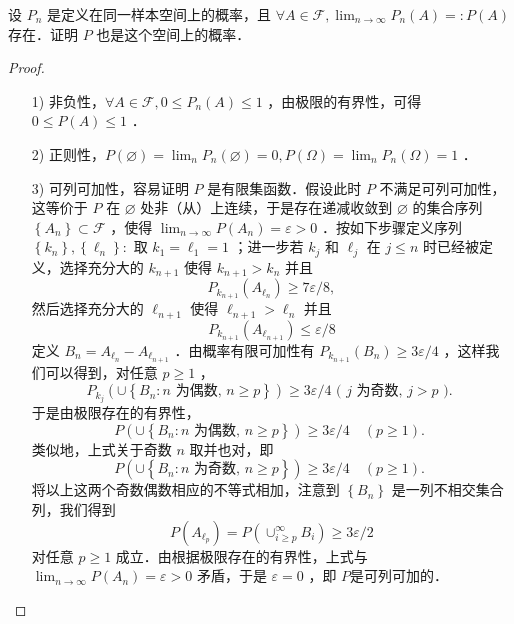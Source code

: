 \begin{exercise}
    设 $P_n$ 是定义在同一样本空间上的概率，且 $\forall A \in \mathscr{F}, \lim _{n \rightarrow \infty} P_n(A)=: P(A)$ 存在．证明 $P$ 也是这个空间上的概率．
\end{exercise}
\begin{proof}
    \begin{enumerate}
        \item[1)] 非负性，$\forall A \in \mathscr{F}, 0 \leq P_n(A) \leq 1$ ，由极限的有界性，可得 $0 \leq P(A) \leq 1$ ．
        \item[2)] 正则性，$P(\varnothing)=\lim _n P_n(\varnothing)=0, P(\Omega)=\lim _n P_n(\Omega)=1$ ．
        \item[3)] 可列可加性，容易证明 $P$ 是有限集函数．假设此时 $P$ 不满足可列可加性，这等价于 $P$ 在 $\varnothing$ 处非（从）上连续，于是存在递减收敛到 $\varnothing$ 的集合序列 $\left\{A_n\right\} \subset \mathscr{F}$ ，使得 $\lim _{n \rightarrow \infty} P\left(A_n\right)=\varepsilon>0$ ．按如下步骤定义序列 $\left\{k_n\right\},\left\{\ell_n\right\}:$ 取 $k_1=\ell_1=1$ ；进一步若 $k_j$ 和 $\ell_j$ 在 $j \leq n$ 时已经被定义，选择充分大的 $k_{n+1}$ 使得 $k_{n+1}>k_n$ 并且
            $$
                P_{k_{n+1}}\left(A_{\ell_n}\right) \geq 7 \varepsilon / 8,
            $$
            然后选择充分大的 $\ell_{n+1}$ 使得 $\ell_{n+1}>\ell_n$ 并且
            $$
                P_{k_{n+1}}\left(A_{\ell_{n+1}}\right) \leq \varepsilon / 8
            $$
            定义 $B_n=A_{\ell_n}-A_{\ell_{n+1}}$ ．由概率有限可加性有 $P_{k_{n+1}}\left(B_n\right) \geq 3 \varepsilon / 4$ ，这样我们可以得到，对任意 $p \geq 1$ ，
            $$
                P_{k_j}\left(\cup\left\{B_n: n \text { 为偶数, } n \geq p\right\}\right) \geq 3 \varepsilon / 4 \text { ( } j \text { 为奇数, } j>p \text { ). }
            $$
            于是由极限存在的有界性，
            $$
                P\left(\cup\left\{B_n: n \text { 为偶数, } n \geq p\right\}\right) \geq 3 \varepsilon / 4 \quad(p \geq 1) \text {. }
            $$
            类似地，上式关于奇数 $n$ 取并也对，即
            $$
                P\left(\cup\left\{B_n: n \text { 为奇数, } n \geq p\right\}\right) \geq 3 \varepsilon / 4 \quad(p \geq 1) \text {. }
            $$
            将以上这两个奇数偶数相应的不等式相加，注意到 $\left\{B_n\right\}$ 是一列不相交集合列，我们得到
            $$
                P\left(A_{\ell_p}\right)=P\left(\cup_{i \geq p}^{\infty} B_i\right) \geq 3 \varepsilon / 2
            $$
            对任意 $p \geq 1$ 成立．由根据极限存在的有界性，上式与 $\lim _{n \rightarrow \infty} P\left(A_n\right)=\varepsilon>0$ 矛盾，于是 $\varepsilon=0$ ，即 $P$是可列可加的．
    \end{enumerate}
\end{proof}
